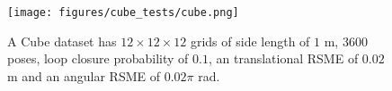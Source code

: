 \begin{figure}[b]
	\centering
	\texttt{[image: figures/cube\_tests/cube.png]}
	\caption{A {\sf\small Cube} dataset has $12\times12\times12$ grids of side length of $1$ m, $3600$ poses, loop closure probability of  $0.1$, an translational RSME of $ 0.02$ m and an angular RSME of $0.02\pi$ rad.}\label{fig::cube}
	\vspace{-0.75em}
\end{figure}
